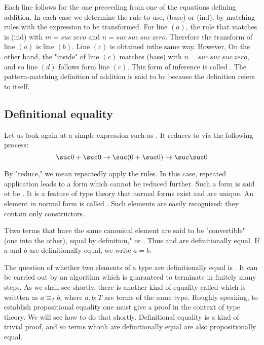Each line  follows for the one preceeding from one of the  equations defining addition.  In each case  we determine the rule to use, (base) or (ind), by matching rules with the expression to be transformed.  For  line $(a)$, the rule that matches is  (ind) with $m = suc\  zero$ and $n = suc\ suc\ suc\ zero$. Therefore the transform of line $(a)$ is line $(b)$.  Line $(c)$ is obtained inthe same way.  However, On the other hand, the "inside" of line $(c)$ matches (base) with $n = suc\ suc\ suc\ zero$, and so line $(d)$ follows form line $(c)$.  This form of inference is called .  The pattern-matching definition of addition is said to be  because the definition refers to itself.  



\subsection{Definitional equality}

Let us look again at a simple expression such as  . It reduces to  via the following process:
$$
\suc 0 + \suc 0 \to \suc ( 0 + \suc 0) \to \suc \suc 0
$$

By "reduce," we mean repeatedly apply the rules. In this case, repeated application leads to a form which cannot be reduced further.  Such a form is said ot be .  It is a feature of type theory that normal forms exist and are unique.  An element in normal form is called .  Such elements are easily recognized: they contain only constructors.


Ttwo terms that have the same canonical element are said to be "convertible" (one into the other), equal by definition," or .  Thus  and  are definitionally equal.  If $a$ and $b$ are definitionally equal, we write $a = b$.  

The question of whether two elements of a type are definitionally equal is . It can be carried out by an algorithm which is guaranteed to terminate in finitely many steps.  As we shall see shortly, there is another kind of equality called  which is writtten as  $a \equiv_T b$, where $a, b: T$ are terms of the same type. Roughly speaking, to establish propositional equality one must give a proof in the context of type theory.  We will see how to do that shortly.  Definitional equality is a kind of trivial proof, and so terms whicih are definitionally equal are also propositionally equal.


